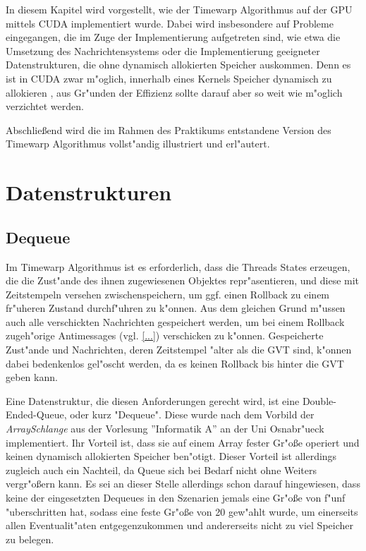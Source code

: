 \documentclass{scrreprt}
\begin{document}
In diesem Kapitel wird vorgestellt, wie der Timewarp Algorithmus auf der GPU mittels CUDA implementiert wurde. Dabei wird
insbesondere auf Probleme eingegangen, die im Zuge der Implementierung aufgetreten sind, wie etwa die Umsetzung des
Nachrichtensystems oder die Implementierung geeigneter Datenstrukturen, die ohne dynamisch allokierten Speicher
auskommen. Denn es ist in CUDA zwar m"oglich, innerhalb eines Kernels Speicher dynamisch zu allokieren \cite{...}, aus
Gr"unden der Effizienz sollte darauf aber so weit wie m"oglich verzichtet werden.

Abschlie\ss end wird die im Rahmen des Praktikums entstandene Version des Timewarp Algorithmus vollst"andig illustriert
und erl"autert.

\section{Datenstrukturen}
\subsection{Dequeue}
Im Timewarp Algorithmus ist es erforderlich, dass die Threads States erzeugen, die die Zust"ande des ihnen zugewiesenen
Objektes repr"asentieren, und diese mit Zeitstempeln versehen zwischenspeichern, um ggf. einen Rollback zu einem
fr"uheren Zustand durchf"uhren zu k"onnen. Aus dem gleichen Grund m"ussen auch alle verschickten Nachrichten gespeichert
werden, um bei einem Rollback zugeh"orige Antimessages (vgl. \ref{...}) verschicken zu k"onnen.
Gespeicherte Zust"ande und Nachrichten, deren Zeitstempel "alter als die GVT sind, k"onnen dabei bedenkenlos gel"oscht
werden, da es keinen Rollback bis hinter die GVT geben kann.

Eine Datenstruktur, die diesen Anforderungen gerecht wird, ist eine Double-Ended-Queue, oder kurz "Dequeue". Diese wurde
nach dem Vorbild der \emph{ArraySchlange} aus der Vorlesung ''Informatik A'' \cite{...} an der Uni Osnabr"ueck
implementiert. Ihr Vorteil ist, dass sie auf einem Array fester Gr"o\ss e operiert und keinen dynamisch allokierten
Speicher ben"otigt. Dieser Vorteil ist allerdings zugleich auch ein Nachteil, da Queue sich bei Bedarf nicht ohne
Weiters vergr"o\ss ern kann. Es sei an dieser Stelle allerdings schon darauf hingewiesen, dass keine der eingesetzten
Dequeues in den Szenarien jemals eine Gr"o\ss e von f"unf "uberschritten hat, sodass eine feste Gr"o\ss e von 20
gew"ahlt wurde, um einerseits allen Eventualit"aten entgegenzukommen und andererseits nicht zu viel Speicher zu belegen.
\end{document}
